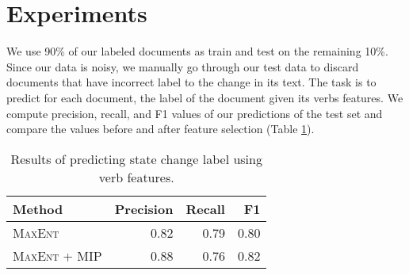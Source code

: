 \section{Experiments}

We use 90\% of our labeled documents as train and test on the remaining 10\%. Since our data is noisy, we manually go through our test data to discard documents that have incorrect label to the change in its text. The task is to predict for each document, the label of the document given its verbs features. We compute precision, recall, and F1 values of our predictions of the test set and compare the values before and after feature selection (Table \ref{table:performance}).

\begin{table}
\begin{small}
\begin{center}
\begin{tabular}{|l|r|r|r|}
\hline
Method & Precision & Recall & F1 \\
\hline
\textsc{MaxEnt} & 0.82 & 0.79 & 0.80 \\
\hline
\textsc{MaxEnt} + MIP & 0.88 & 0.76 & 0.82 \\
\hline
\end{tabular}
\caption{\label{table:performance} Results of predicting state change label using verb features.}
\end{center}
\end{small}
\end{table}

